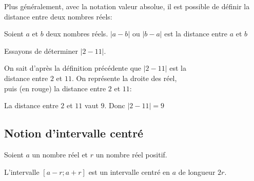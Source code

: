 \bigskip
 Plus généralement, avec la notation valeur absolue, il est possible de définir la distance entre deux nombres réels:

\begin{prop}{}{}
Soient $a$ et $b$ deux nombres réels. $|a-b|$ ou $|b-a|$ est la distance entre $a$ et $b$ 
\end{prop}

\smallskip
\begin{ex}{}{}
Essayons de déterminer $|2-11|$.\medskip 

 On sait d'après la définition précédente que $|2-11|$ est la \\distance entre $2$ et $11$. On représente la droite des réel, \\puis (en rouge) la distance entre $2$ et $11$:
\\
\vspace{-19mm}
\begin{flushright}
\end{flushright}

 La distance entre $2$ et $11$ vaut $9$. Donc $|2-11| = 9$
\end{ex}

\subsection{Notion d'intervalle centré}

\begin{defi}{}{}
Soient $a$ un nombre réel et $r$ un nombre réel positif. 

 L'intervalle \quad $[a-r;a+r]$ \quad est un intervalle centré en \quad $a$ \quad de longueur \quad $2r$.
\end{defi}

